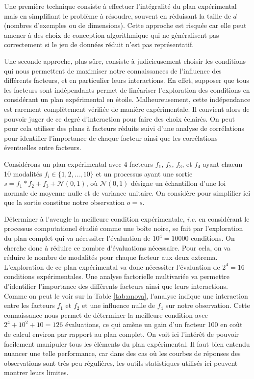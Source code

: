 Une première technique consiste à effectuer l'intégralité du plan expérimental mais en simplifiant le problème à résoudre, souvent en réduisant la taille de $d$ (nombres d'exemples ou de dimensions). Cette approche est risquée car elle peut amener à des choix de conception algorithmique qui ne généralisent pas correctement si le jeu de données réduit n'est pas représentatif.

Une seconde approche, plus sûre, consiste à judicieusement choisir les conditions qui nous permettent de maximiser notre connaissances de l'influence des différents facteurs, et en particulier leurs interactions. En effet, supposer que tous les facteurs sont indépendants permet de linéariser l'exploration des conditions en considérant un plan expérimental en étoile. Malheureusement, cette indépendance est rarement complètement vérifiée de manière expérimentale. Il convient alors de pouvoir juger de ce degré d'interaction pour faire des choix éclairés. On peut pour cela utiliser des plans à facteurs réduits suivi d'une analyse de corrélations pour identifier l'importance de chaque facteur ainsi que les corrélations éventuelles entre facteurs.~\cite{montgomery2017design}

Considérons un plan expérimental avec 4 facteurs $f_1$, $f_2$, $f_3$, et $f_4$ ayant chacun 10 modalités $f_i \in \{1, 2, ..., 10\}$ et un processus ayant une sortie $s=f_1*f_2+f_3+\mathcal{N}(0, 1)$, où $\mathcal{N}(0, 1)$ désigne un échantillon d'une loi normale de moyenne nulle et de variance unitaire. On considère pour simplifier ici que la sortie constitue notre observation $o=s$.

Déterminer \og à l'aveugle \fg la meilleure condition expérimentale, \textit{i.e.} en considérant le processus computationel étudié comme une boîte noire, se fait  par l'exploration du plan complet qui va nécessiter l'évaluation de $10^4=10000$ conditions. On cherche donc à réduire ce nombre d'évaluations nécessaire. Pour cela, on va réduire le nombre de modalités pour chaque facteur aux deux extrema. L'exploration de ce plan expérimental va donc nécessiter l'évaluation de $2^4 = 16$ conditions expérimentales. Une analyse factorielle multivariée va permettre d'identifier l'importance des différents facteurs ainsi que leurs interactions. Comme on peut le voir sur la Table \ref{tab:anova}, l'analyse indique une interaction entre les facteurs $f_1$ et $f_2$ et une influence nulle de $f_4$ sur notre observation. Cette connaissance nous permet de déterminer la meilleure condition avec $2^4+10^2+10=126$ évaluations, ce qui amène un gain d'un facteur 100 en coût de calcul environ par rapport au plan complet. On voit ici l'intérêt de pouvoir facilement manipuler tous les éléments du plan expérimental. Il faut bien entendu nuancer une telle performance, car dans des cas où les courbes de réponses des observations sont très peu régulières, les outils statistiques utilisés ici peuvent montrer  leurs limites.

